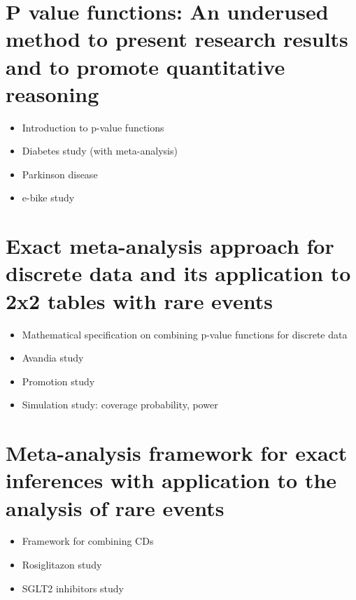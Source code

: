 \documentclass{article}
\begin{document}
\section{P value functions: An underused method to present research results and to promote quantitative reasoning}
\begin{itemize}
  \item Introduction to p-value functions
  \item Diabetes study (with meta-analysis)
  \item Parkinson disease
  \item e-bike study
\end{itemize}

\section{Exact meta-analysis approach for discrete data and its application to 2x2 tables with rare events}
\begin{itemize}
  \item Mathematical specification on combining p-value functions for discrete data
  \item Avandia study
  \item Promotion study
  \item Simulation study: coverage probability, power
\end{itemize}

\section{Meta-analysis framework for exact inferences with application to the analysis of rare events}
\begin{itemize}
  \item Framework for combining CDs
  \item Rosiglitazon study
  \item SGLT2 inhibitors study
\end{itemize}
\end{document}
